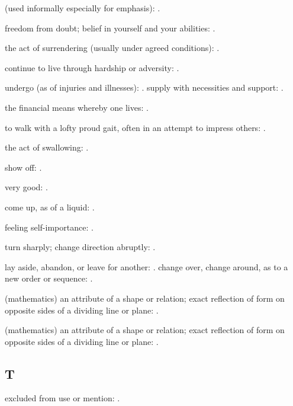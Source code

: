   (used informally especially for emphasis): .

  freedom from doubt; belief in yourself and your abilities: .

  the act of surrendering (usually under agreed conditions): .

  continue to live through hardship or adversity: .

  undergo (as of injuries and illnesses): . supply with necessities and support: .

  the financial means whereby one lives: .

  to walk with a lofty proud gait, often in an attempt to impress others: .

  the act of swallowing: .

  show off: .

  very good: .

  come up, as of a liquid: .

  feeling self-importance: .

  turn sharply; change direction abruptly: .

  lay aside, abandon, or leave for another: . change over, change around, as to a new order or sequence: .

  (mathematics) an attribute of a shape or relation; exact reflection of form on opposite sides of a dividing line or plane: .

  (mathematics) an attribute of a shape or relation; exact reflection of form on opposite sides of a dividing line or plane: .

\subsection*{T}

  excluded from use or mention: .

